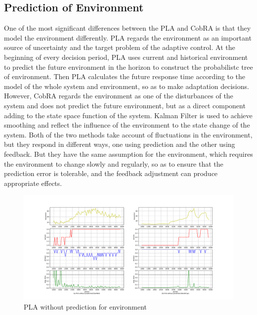 \documentclass[sigconf]{acmart}
\begin{document}
\subsection{Prediction of Environment}
One of the most significant differences between the PLA and CobRA is that they model the environment differently.
PLA regards the environment as an important source of uncertainty and the target problem of the adaptive control. At the beginning of every decision period,  PLA uses current and historical environment to predict the future environment in the horizon to construct the probabilistc tree of environment. Then PLA calculates the future response time according to the model of the whole system and environment, so as to make adaptation decisions. 
However, CobRA regards the environment as one of the disturbances of the system and does not predict the future environment, but as a direct component adding to the state space function of the system. Kalman Filter is used to achieve smoothing and reflect the influence of the environment to the state change of the system.
Both of the two methods take account of fluctuations in the environment, but they respond in different ways, one using prediction and the other using feedback. But they have the same assumption for the environment, which requires the environment to change slowly and regularly, so as to ensure that the prediction error is tolerable, and the feedback adjustment can produce appropriate effects.
\begin{figure}[h]
	\centering
	\includegraphics[width=\linewidth]{nopre}
	\caption{PLA without prediction for environment}
	\label{nopre}
\end{figure}
\end{document}
